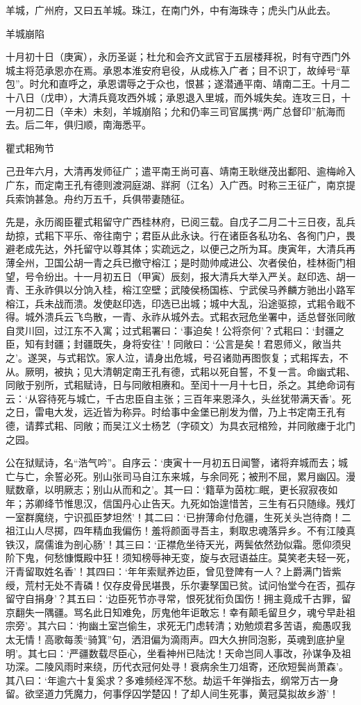 \documentclass[]{article}
\begin{document}
羊城，广州府，又曰五羊城。珠江，在南门外，中有海珠寺；虎头门从此去。

羊城崩陷

十月初十日（庚寅），永历圣诞；杜允和会齐文武官于五层楼拜祝，时有守西门外城主将范承恩亦在焉。承恩本淮安府皂役，从成栋入广者；目不识丁，故绰号``草包''。时允和直呼之，承恩谓辱之于众也，恨甚；遂潜通平南、靖南二王。十月二十八日（戊申），大清兵竟攻西外城；承恩退入里城，而外城失矣。连攻三日，十一月初二日（辛未）未刻，羊城崩陷；允和仍率三司官属携``两广总督印''航海而去。后二年，俱归顺，南海悉平。

瞿式耜殉节

己丑年六月，大清再发师征广；遣平南王尚可喜、靖南王耿继茂出鄱阳、逾梅岭入广东，而定南王孔有德则渡洞庭湖、牂牁（江名）入广西。时称三王征广，南京提兵索饷甚急。舟约万五千，兵俱带妻随征。

先是，永历阁臣瞿式耜留守广西桂林府，已阅三载。自戊子二月二十三日夜，乱兵劫掠，式耜下平乐、帝往南宁；君臣从此永诀。行在诸臣各私功名、各徇门户，畏避老成先达，外托留守以尊其体；实疏远之，以便己之所为耳。庚寅年，大清兵再薄全州，卫国公胡一青之兵已撤守榕江；是时勋帅咸进公、次者侯伯，桂林衙门相望，号令纷出。十一月初五日（甲寅）辰刻，报大清兵大举入严关。赵印选、胡一青、王永祚俱以分饷入桂，榕江空壁；武陵侯杨国栋、宁武侯马养麟方驰出小路军榕江，兵未战而溃。发使赵印选，印选已出城；城中大乱，沿途驱掠，式耜令戢不得。城外溃兵云飞鸟散，一青、永祚从城外去。式耜衣冠危坐署中，适总督张同敞自灵川回，过江东不入寓；过式耜署曰：`事迫矣！公将奈何'？式耜曰：`封疆之臣，知有封疆；封疆既失，身将安往'！同敞曰：`公言是矣！君恩师义，敞当共之'。遂哭，与式耜饮。家人泣，请身出危城，号召诸勋再图恢复；式耜挥去，不从。厥明，被执；见大清朝定南王孔有德，式耜以死自誓，不复一言。命幽式耜、同敞于别所，式耜赋诗，日与同敞相赓和。至闰十一月十七日，杀之。其绝命词有云：`从容待死与城亡，千古忠臣自主张；三百年来恩泽久，头丝犹带满天香'。死之日，雷电大发，远近皆为称异。时给事中金堡已削发为僧，乃上书定南王孔有德，请葬式耜、同敞；而吴江义士杨艺（字硕文）为具衣冠棺殓，并同敞瘗于北门之园。

公在狱赋诗，名``浩气吟''。自序云：`庚寅十一月初五日闻警，诸将弃城而去；城亡与亡，余誓必死。别山张司马自江东来城，与余同死；被刑不屈，累月幽囚。漫赋数章，以明厥志；别山从而和之'。其一曰：`籍草为茵枕□眠，更长寂寂夜如年；苏卿绛节惟思汉，信国丹心止告天。九死如饴遑惜苦，三生有石只随缘。残灯一室群魔绕，宁识孤臣梦坦然'！其二曰：`已拚薄命付危疆，生死关头岂待商！二祖江山人尽掷，四年精血我偏伤！羞将颜面寻吾主，剩取忠魂落异乡。不有江陵真铁汉，腐儒谁为剖心肠'！其三曰：`正襟危坐待天光，两鬓依然劲似霜。愿仰须臾阶下鬼，何愁慷慨殿中狂！须知榜辱神无变，旋与衣冠语益庄。莫笑老夫轻一死，汗青留取姓名香'！其四曰：`年年索赋养边臣，曾见登陴有一人？上爵满门皆紫绶，荒村无处不青磷！仅存皮骨民堪畏，乐尔妻孥国已贫。试问怡堂今在否，孤存留守自捐身'？其五曰：`边臣死节亦寻常，恨死犹衔负国伤！拥主竟成千古罪，留京翻失一隅疆。骂名此日知难免，厉鬼他年讵敢忘！幸有颠毛留旦夕，魂兮早赴祖宗旁'。其六曰：`拘幽土室岂偷生，求死无门虑转清；劝勉烦君多苦语，痴愚叹我太无情！高歌每羡``骑箕''句，洒泪偏为滴雨声。四大久拚同泡影，英魂到底护皇明'。其七曰：`严疆数载尽臣心，坐看神州已陆沈！天命岂同人事改，孙谋争及祖功深。二陵风雨时来绕，历代衣冠何处寻！衰病余生刀俎寄，还欣短鬓尚萧森'。其八曰：`年逾六十复奚求？多难频经浑不愁。劫运千年弹指去，纲常万古一身留。欲坚道力凭魔力，何事俘囚学楚囚！了却人间生死事，黄冠莫拟故乡游'！
\end{document}
